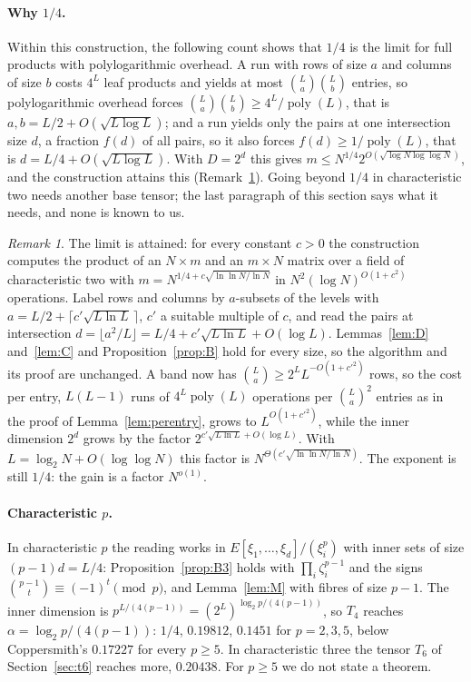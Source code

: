 \documentclass[11pt]{article}
\theoremstyle{definition}
\theoremstyle{remark}
\newtheorem{remark}[theorem]{Remark}
\DeclareMathOperator{\poly}{poly}
\begin{document}
\paragraph{Why $1/4$.} Within this construction, the following count shows that $1/4$ is the limit for full products with polylogarithmic overhead. A run with rows of size $a$ and columns of size $b$ costs $4^L$ leaf products and yields at most $\binom La\binom Lb$ entries, so polylogarithmic overhead forces $\binom La\binom Lb\ge4^L/\poly(L)$, that is $a,b=L/2+O(\sqrt{L\log L})$; and a run yields only the pairs at one intersection size $d$, a fraction $f(d)$ of all pairs, so it also forces $f(d)\ge1/\poly(L)$, that is $d=L/4+O(\sqrt{L\log L})$. With $D=2^d$ this gives $m\le N^{1/4}2^{O(\sqrt{\log N\log\log N})}$, and the construction attains this (Remark~\ref{rem:beyond}). Going beyond $1/4$ in characteristic two needs another base tensor; the last paragraph of this section says what it needs, and none is known to us.

\begin{remark}\label{rem:beyond}
The limit is attained: for every constant $c>0$ the construction computes the product of an $N\times m$ and an $m\times N$ matrix over a field of characteristic two with $m=N^{1/4+c\sqrt{\ln\ln N/\ln N}}$ in $N^2(\log N)^{O(1+c^2)}$ operations. Label rows and columns by $a$-subsets of the levels with $a=L/2+\lceil c'\sqrt{L\ln L}\,\rceil$, $c'$ a suitable multiple of $c$, and read the pairs at intersection $d=\lfloor a^2/L\rfloor=L/4+c'\sqrt{L\ln L}+O(\log L)$. Lemmas~\ref{lem:D} and~\ref{lem:C} and Proposition~\ref{prop:B} hold for every size, so the algorithm and its proof are unchanged. A band now has $\binom La\ge2^LL^{-O(1+c'^2)}$ rows, so the cost per entry, $L(L-1)$ runs of $4^L\poly(L)$ operations per $\binom La^2$ entries as in the proof of Lemma~\ref{lem:perentry}, grows to $L^{O(1+c'^2)}$, while the inner dimension $2^d$ grows by the factor $2^{c'\sqrt{L\ln L}+O(\log L)}$. With $L=\log_2N+O(\log\log N)$ this factor is $N^{\Theta(c'\sqrt{\ln\ln N/\ln N})}$. The exponent is still $1/4$: the gain is a factor $N^{o(1)}$.
\end{remark}

\paragraph{Characteristic $p$.} In characteristic $p$ the reading works in $E[\xi_1,\dots,\xi_d]/(\xi_i^p)$ with inner sets of size $(p-1)d=L/4$: Proposition~\ref{prop:B3} holds with $\prod_i\zeta_i^{p-1}$ and the signs $\binom{p-1}t\equiv(-1)^t\pmod p$, and Lemma~\ref{lem:M} with fibres of size $p-1$. The inner dimension is $p^{L/(4(p-1))}=(2^L)^{\log_2p/(4(p-1))}$, so $T_4$ reaches $\alpha=\log_2p/(4(p-1))$: $1/4$, $0.19812$, $0.1451$ for $p=2,3,5$, below Coppersmith's $0.17227$ for every $p\ge5$. In characteristic three the tensor $T_6$ of Section~\ref{sec:t6} reaches more, $0.20438$. For $p\ge5$ we do not state a theorem.
\end{document}
